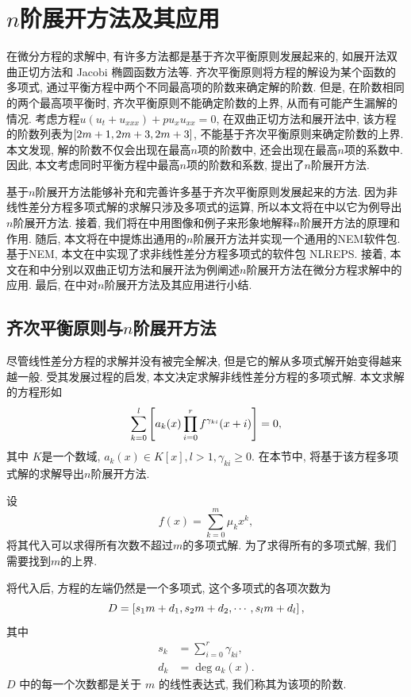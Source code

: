 \chapter{$n$阶展开方法及其应用}\label{ch04}
在微分方程的求解中, 有许多方法都是基于齐次平衡原则发展起来的, 如\Painleve{}展开法\D 双曲正切方法和 Jacobi 椭圆函数方法等. 齐次平衡原则将方程的解设为某个函数的多项式, 通过平衡方程中两个不同最高项的阶数来确定解的阶数. 但是, 在阶数相同的两个最高项平衡时, 齐次平衡原则不能确定阶数的上界, 从而有可能产生漏解的情况. 考虑方程$u(u_t+u_{xxx})+pu_x u_{xx}=0$, 在双曲正切方法和\Painleve{}展开法中, 该方程的阶数列表为$\left[2m+1,2m+3,2m+3\right]$, 不能基于齐次平衡原则来确定阶数的上界. 本文发现, 解的阶数不仅会出现在最高$n$项的阶数中, 还会出现在最高$n$项的系数中. 因此, 本文考虑同时平衡方程中最高$n$项的阶数和系数, 提出了$n$阶展开方法. 

基于$n$阶展开方法能够补充和完善许多基于齐次平衡原则发展起来的方法. 因为非线性差分方程多项式解的求解只涉及多项式的运算, 所以本文将在中以它为例导出$n$阶展开方法. 接着, 我们将在中用图像和例子来形象地解释$n$阶展开方法的原理和作用. 随后, 本文将在中提炼出通用的$n$阶展开方法并实现一个通用的NEM软件包. 基于NEM, 本文在中实现了求非线性差分方程多项式的软件包 NLREPS. 接着, 本文在和中分别以双曲正切方法和\Painleve{}展开法为例阐述$n$阶展开方法在微分方程求解中的应用. 最后, 在中对$n$阶展开方法及其应用进行小结. 

\section{齐次平衡原则与$n$阶展开方法} \label{ch4sec1}
尽管线性差分方程的求解并没有被完全解决, 但是它的解从多项式解开始变得越来越一般. 受其发展过程的启发, 本文决定求解非线性差分方程的多项式解. 本文求解的方程形如
\begin{equation}
\sum_{k=0}^l{\left[a_k(x)\prod_{i=0}^r{f^{\gamma_{ki}}(x+i)}\right]}=0,
\label{eq}
\end{equation}
其中 $K$是一个数域, $a_k(x)\in K[x], l>1, \gamma_{ki}\ge 0$. 在本节中, 将基于该方程多项式解的求解导出$n$阶展开方法. 

设
\begin{equation}
f(x)=\sum_{k=0}^m{\mu_kx^k},
\label{fm1}
\end{equation}
将其代入可以求得所有次数不超过$m$的多项式解. 为了求得所有的多项式解, 我们需要找到$m$的上界.

将代入后, 方程的左端仍然是一个多项式, 这个多项式的各项次数为
\begin{equation}
D = \left[s_1 m+d_1,s_2 m+d_2,\cdots,s_l m+d_l\right],
\end{equation}
其中
\begin{equation}
\begin{split}
s_k&=\sum_{i=0}^r{\gamma_{ki}}, \\
d_k&=\deg a_k(x).
\end{split}
\label{eq-sd}
\end{equation}
$D$ 中的每一个次数都是关于 $m$ 的线性表达式, 我们称其为该项的阶数.


